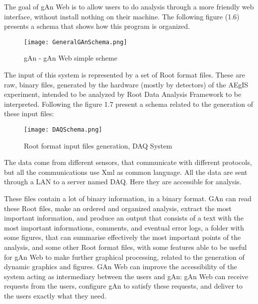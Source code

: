 The goal of gAn Web is to allow users to do analysis through a more friendly web interface, without install nothing on their machine. The following figure (1.6) presents a schema that shows how this program is organized.

\begin{figure}[H]
\centering
\texttt{[image: GeneralGAnSchema.png]} 
\caption{gAn - gAn Web simple scheme}
\end{figure}

The input of this system is represented by a set of Root format files. These are raw, binary files, generated by the hardware (mostly by detectors) of the AEgIS experiment, intended to be analyzed by Root Data Analysis Framework to be interpreted. 
Following the figure 1.7 present a schema related to the generation of these input files:

\begin{figure}[H]
\centering
\texttt{[image: DAQSchema.png]} 
\caption{Root format input files generation, DAQ System}
\end{figure}

The data come from different sensors, that communicate with different protocols,  but all the communications use Xml as common language. All the data are sent through a LAN to a server named DAQ. Here they are accessible for analysis. 

These files contain a lot of binary information, in a binary format. GAn can read these Root files, make an ordered and organized analysis, extract the most important information, and produce an output that consists of a text with the most important informations, comments, and eventual error logs, a folder with some figures, that can summarise effectively the most important points of the analysis, and some other Root format files, with some features able to be useful  for gAn Web to make further graphical processing, related to the generation of dynamic graphics and figures. GAn Web can improve the accessibility of the system acting as intermediary between the users and gAn: gAn Web can receive requests from the users, configure gAn to satisfy these requests, and deliver to the users exactly what they need.
